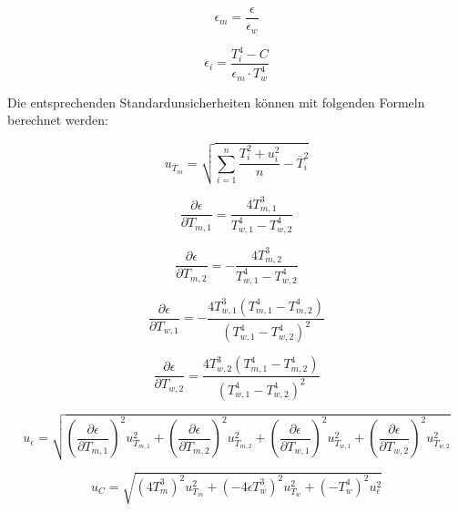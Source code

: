 \documentclass{article}
\begin{document}
\begin{equation}
    \epsilon_{m} = \frac{\epsilon}{\epsilon_{w}}
\end{equation}

\begin{equation}
    \epsilon_i = \frac{T_i^4 - C}{\epsilon_{m} \cdot T_w^4}
\end{equation}

Die entsprechenden Standardunsicherheiten können mit folgenden Formeln berechnet werden:

\begin{equation}
    u_{\overline T_m} = \sqrt{ \sum_{i=1}^n \frac{T_i^2 + u_i^2}{n} - \overline T_i^2}
\end{equation}

\begin{equation}
    \frac{\partial \epsilon}{\partial T_{m,1}} = \frac{4T_{m,1}^3}{T_{w,1}^4 - T_{w,2}^4} 
\end{equation}

\begin{equation}
    \frac{\partial \epsilon}{\partial T_{m,2}} = -\frac{4T_{m,2}^3}{T_{w,1}^4 - T_{w,2}^4}
\end{equation}

\begin{equation}
    \frac{\partial \epsilon}{\partial T_{w,1}} = -\frac{4T_{w,1}^3 \left( T_{m,1}^4 - T_{m,2}^4 \right)}{\left( T_{w,1}^4 - T_{w,2}^4\right)^2} 
\end{equation}

\begin{equation}
    \frac{\partial \epsilon}{\partial T_{w,2}} =  \frac{4T_{w,2}^3 \left( T_{m,1}^4 - T_{m,2}^4 \right)}{\left( T_{w,1}^4 - T_{w,2}^4 \right)^2}
\end{equation}

\begin{equation}
    u_\epsilon = \sqrt{
        \left( \frac{\partial \epsilon}{\partial T_{m,1}} \right)^2 u_{T_{m,1}}^2 + 
        \left( \frac{\partial \epsilon}{\partial T_{m,2}} \right)^2 u_{T_{m,2}}^2 + 
        \left( \frac{\partial \epsilon}{\partial T_{w,1}} \right)^2 u_{T_{w,1}}^2 + 
        \left( \frac{\partial \epsilon}{\partial T_{w,2}} \right)^2 u_{T_{w,2}}^2
    }
\end{equation}

\begin{equation}
    u_C = \sqrt{\left( 4 T_m^3 \right)^2 u_{T_m}^2 + \left( -4 \epsilon T_w^3 \right)^2 u_{T_w}^2 + \left( -T_w^4 \right)^2  u_{\epsilon}^2} 
\end{equation}
\end{document}
